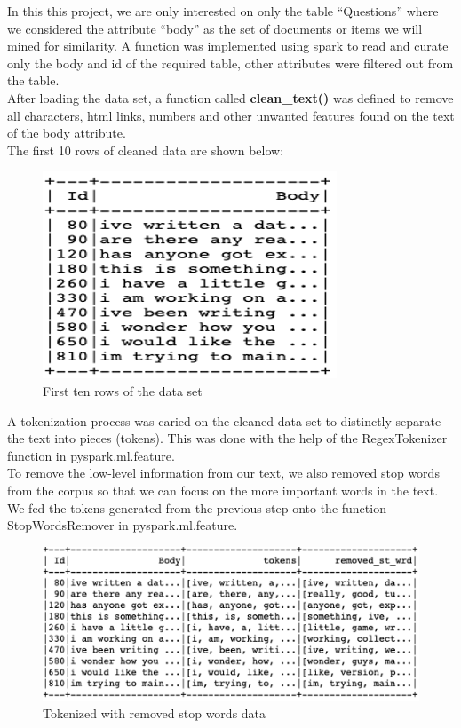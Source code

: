 \documentclass[12pt]{article}
\begin{document}
	In this this project, we are only interested on only the table “Questions” where we considered the attribute “body” as the set of documents or items we will mined for similarity. A function was implemented using spark to read and curate only the body and id of the required table, other attributes were filtered out from the table. 
\\
	After loading the data set, a function called \textbf{clean\_text()} was defined to remove all characters, html links, numbers and other unwanted features found on the text of the body attribute. 
\\
	The first 10 rows of cleaned data are shown below: \\
	\begin{figure}[H]
		\includegraphics[scale=1]{dataset.png}
		\centering
		\caption{First ten rows of the data set}
		\label{fig:dataset}
	\end{figure}
	A tokenization process was caried on the cleaned data set to distinctly separate the text into pieces (tokens). This was done with the help of the RegexTokenizer function in pyspark.ml.feature.\\
	To remove the low-level information from our text, we also removed stop words from the corpus so that we can focus on the more important words in the text. We fed the tokens generated from the previous step onto the function StopWordsRemover in pyspark.ml.feature.
		\begin{figure}[H]
		\includegraphics[scale=0.8]{tokenize.png}
		\centering
		\caption{Tokenized with removed stop words data}
		\label{fig:token}
	\end{figure}
\end{document}
